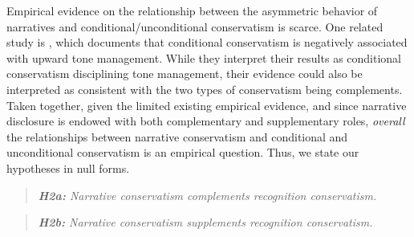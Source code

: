 \documentclass[letterpaper,12pt]{article}
\begin{document}
\begin{spacing}{1.5}
\begin{comment}
\citeA[footnote 4, CON5-7]{fasbStatementFinancialAccounting1984} gives several examples on the complementary role of notes to financial statements:

\begin{adjustwidth}{1cm}{1cm}
\begin{singlespace}
\indent \textit{For example, notes provide essential descriptive information for long-term obligations, including when amounts are due, what interest they bear, and whether important restrictions are imposed by related covenants. For inventory, the notes provide information on the measurement method used---FIFO cost, LIFO cost, current market value, etc. For an estimated litigation liability, an extended discussion of the circumstances, counsel's opinions, and the basis for management's judgment may all be provided in the notes. For sales, useful information about revenue recognition policies may appear only in the notes (FASB Statement No. 47, Disclosure of Long-Term Obligations; ARB No. 43, Chapter 4, ``Inventory Pricing", statement 8; FASB Statement No. 5, Accounting for Contingencies, par. 10; and APB Statement 4, par. 199)}.
\end{singlespace}
\end{adjustwidth}
\end{comment}

Empirical evidence on the relationship between the asymmetric behavior of narratives and conditional/unconditional conservatism is scarce. One related study is , which documents that conditional conservatism is negatively associated with upward tone management. While they interpret their results as conditional conservatism disciplining tone management, their evidence could also be interpreted as consistent with the two types of conservatism being complements. Taken together, given the limited existing empirical evidence, and since narrative disclosure is endowed with both complementary and supplementary roles, \textit{overall} the relationships between narrative conservatism and conditional and unconditional conservatism is an empirical question. Thus, we state our hypotheses in null forms.

\begin{quote}\label{hyp:h2a}
	\textit{\textbf{H2a:} Narrative conservatism complements recognition conservatism.}
\end{quote}

\begin{quote}\label{hyp:h2b}
	\textit{\textbf{H2b:} Narrative conservatism  supplements recognition conservatism.}
\end{quote}


\end{spacing}
\end{document}
